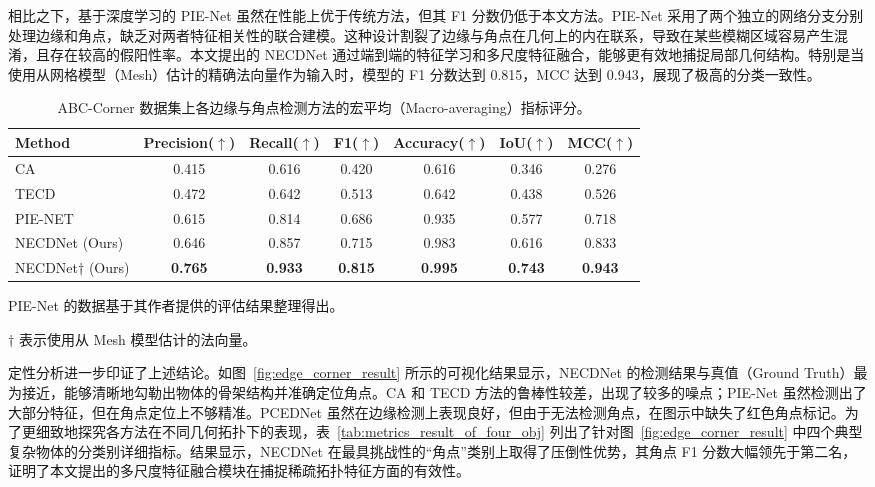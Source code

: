 相比之下，基于深度学习的 PIE-Net 虽然在性能上优于传统方法，但其 F1 分数仍低于本文方法。PIE-Net 采用了两个独立的网络分支分别处理边缘和角点，缺乏对两者特征相关性的联合建模。这种设计割裂了边缘与角点在几何上的内在联系，导致在某些模糊区域容易产生混淆，且存在较高的假阳性率。本文提出的 NECDNet 通过端到端的特征学习和多尺度特征融合，能够更有效地捕捉局部几何结构。特别是当使用从网格模型（Mesh）估计的精确法向量作为输入时，模型的 F1 分数达到 0.815，MCC 达到 0.943，展现了极高的分类一致性。

\begin{table}[ht]
    \centering
    \small
    \setlength{\tabcolsep}{8pt}
    \begin{threeparttable}
    \caption{ABC-Corner 数据集上各边缘与角点检测方法的宏平均（Macro-averaging）指标评分。}
    \label{tab:corner_result}
    \begin{tabular}{lcccccc}
        \toprule
        Method & Precision($\uparrow$) & Recall($\uparrow$) & F1($\uparrow$) & Accuracy($\uparrow$) & IoU($\uparrow$) & MCC($\uparrow$) \\
        \midrule
        CA~\cite{bazazian_fast_2015} & 0.415 & 0.616 & 0.420 & 0.616 & 0.346 & 0.276 \\
        TECD~\cite{ahmed_edge_2018} & 0.472 & 0.642 & 0.513 & 0.642 & 0.438 & 0.526 \\
        PIE-NET~\cite{wang_pienet_2020a} & 0.615 & 0.814 & 0.686 & 0.935 & 0.577 & 0.718 \\
        NECDNet (Ours)  & 0.646 & 0.857 & 0.715 & 0.983 & 0.616 & 0.833 \\
        NECDNet$\dagger$ (Ours)  & \textbf{0.765} & \textbf{0.933} & \textbf{0.815} & \textbf{0.995} & \textbf{0.743} & \textbf{0.943} \\
        \bottomrule
    \end{tabular}
    \begin{tablenotes}
        \footnotesize
        \item PIE-Net 的数据基于其作者提供的评估结果整理得出。
        
        \item $\dagger$ 表示使用从 Mesh 模型估计的法向量。 
     \end{tablenotes}
    
    \end{threeparttable}
    
\end{table}

定性分析进一步印证了上述结论。如图~\ref{fig:edge_corner_result} 所示的可视化结果显示，NECDNet 的检测结果与真值（Ground Truth）最为接近，能够清晰地勾勒出物体的骨架结构并准确定位角点。CA 和 TECD 方法的鲁棒性较差，出现了较多的噪点；PIE-Net 虽然检测出了大部分特征，但在角点定位上不够精准。PCEDNet 虽然在边缘检测上表现良好，但由于无法检测角点，在图示中缺失了红色角点标记。为了更细致地探究各方法在不同几何拓扑下的表现，表~\ref{tab:metrics_result_of_four_obj} 列出了针对图~\ref{fig:edge_corner_result} 中四个典型复杂物体的分类别详细指标。结果显示，NECDNet 在最具挑战性的“角点”类别上取得了压倒性优势，其角点 F1 分数大幅领先于第二名，证明了本文提出的多尺度特征融合模块在捕捉稀疏拓扑特征方面的有效性。

